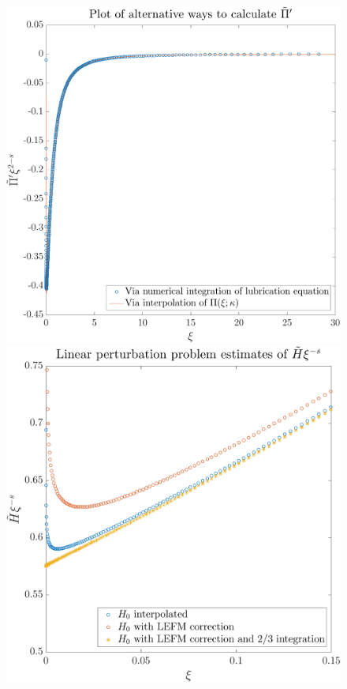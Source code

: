 \documentclass{article}
\begin{document}
%
\begin{figure}[!ht]\centering
\includegraphics[scale=0.5]{Pi-prime.pdf}
\includegraphics[scale=0.6]{linear-perturbation.pdf}
\end{figure}
\end{document}
